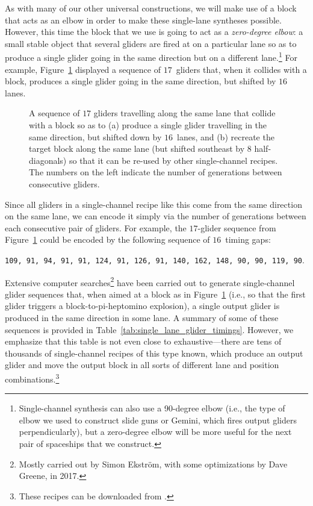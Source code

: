 As with many of our other universal constructions, we will make use of a block that acts as an elbow in order to make these single-lane syntheses possible. However, this time the block that we use is going to act as a \emph{zero-degree elbow}: a small stable object that several gliders are fired at on a particular lane so as to produce a single glider going in the same direction but on a different lane.\footnote{Single-channel synthesis can also use a 90-degree elbow (i.e., the type of elbow we used to construct slide guns or Gemini, which fires output gliders perpendicularly), but a zero-degree elbow will be more useful for the next pair of spaceships that we construct.} For example, Figure~\ref{fig:minus_16_0degree} displayed a sequence of $17$~gliders that, when it collides with a block, produces a single glider going in the same direction, but shifted by $16$ lanes.

\begin{figure}[!htb]
	\centering
	\caption{A sequence of $17$ gliders travelling along the same lane that collide with a block so as to (a) produce a single glider travelling in the same direction, but shifted down by $16$~lanes, and (b) recreate the target block along the same lane (but shifted southeast by 8 half-diagonals) so that it can be re-used by other single-channel recipes. The numbers on the left indicate the number of generations between consecutive gliders.}\label{fig:minus_16_0degree}
\end{figure}

Since all gliders in a single-channel recipe like this come from the same direction on the same lane, we can encode it simply via the number of generations between each consecutive pair of gliders. For example, the $17$-glider sequence from Figure~\ref{fig:minus_16_0degree} could be encoded by the following sequence of $16$~timing gaps:
\begin{center}
	\texttt{109, 91, 94, 91, 91, 124, 91, 126, 91, 140, 162, 148, 90, 90, 119, 90}.
\end{center}

Extensive computer searches\footnote{Mostly carried out by Simon Ekstr{\"o}m, with some optimizations by Dave Greene, in 2017.} have been carried out to generate single-channel glider sequences that, when aimed at a block as in Figure~\ref{fig:minus_16_0degree} (i.e., so that the first glider triggers a block-to-pi-heptomino explosion), a single output glider is produced in the same direction in some lane. A summary of some of these sequences is provided in Table~\ref{tab:single_lane_glider_timings}. However, we emphasize that this table is not even close to exhaustive---there are tens of thousands of single-channel recipes of this type known, which produce an output glider and move the output block in all sorts of different lane and position combinations.\footnote{These recipes can be downloaded from .}

